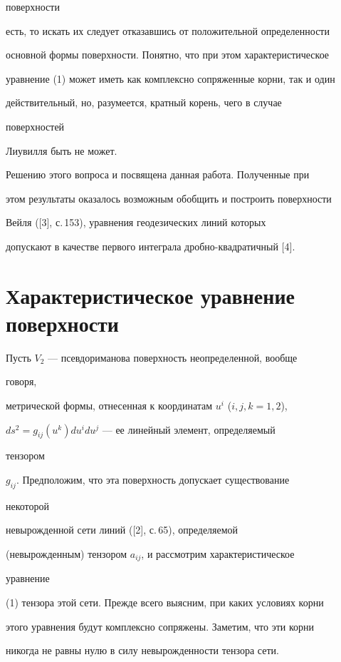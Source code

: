 поверхности 


есть, то искать их следует отказавшись от положительной определенности 


основной формы поверхности. Понятно, что при этом характеристическое  


уравнение (1) может иметь как комплексно сопряженные корни, так и один  


действительный, но, разумеется, кратный корень, чего в случае 


поверхностей 


Лиувилля быть не может. 


Решению этого вопроса и посвящена данная работа. Полученные при  


этом результаты оказалось возможным обобщить и построить поверхности  


Вейля ([3], с.\,153), уравнения геодезических линий которых 


допускают в качестве первого интеграла дробно-квадратичный [4]. 


 


\section{Характеристическое уравнение поверхности} 


 


Пусть $V_2$ --- псевдориманова поверхность неопределенной, вообще 


говоря, 


метрической формы, отнесенная к координатам $u^i$ ($i,j,k=1,2$), 


$ds^2=g_{ij}(u^k)du^i du^j$ --- ее линейный элемент, определяемый 


тензором 


$g_{ij}$. Предположим, что эта поверхность допускает существование 


некоторой 


невырожденной сети линий ([2], с.\,65), определяемой 


(невырожденным) тензором $a_{ij}$, и рассмотрим характеристическое 


уравнение 


(1) тензора этой сети. Прежде всего выясним, при каких условиях корни  


этого уравнения будут комплексно сопряжены. Заметим, что эти корни 


никогда не равны нулю в силу невырожденности тензора сети. 


